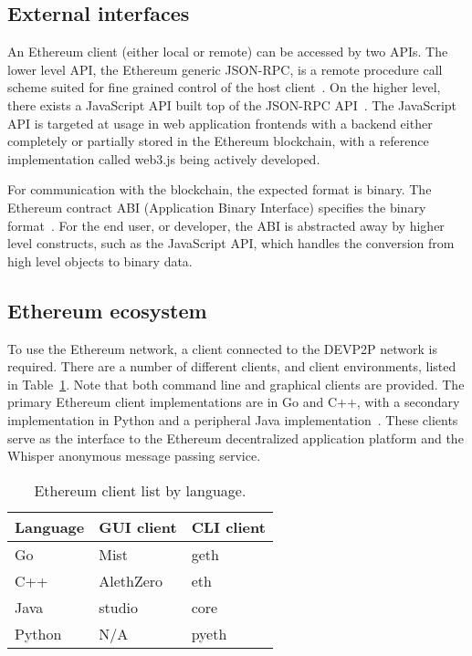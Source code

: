 \subsection{External interfaces}
An Ethereum client (either local or remote) can be accessed by two APIs. The lower level API, the Ethereum generic JSON-RPC, is a remote procedure call scheme suited for fine grained control of the host client~\cite{generic-json-rpc}. On the higher level, there exists a JavaScript API built top of the JSON-RPC API~\cite{javascript-api}. The JavaScript API is targeted at usage in web application frontends with a backend either completely or partially stored in the Ethereum blockchain, with a reference implementation called web3.js being actively developed.

For communication with the blockchain, the expected format is binary. The Ethereum contract ABI (Application Binary Interface) specifies the binary format~\cite{ethereum-contract-abi}. For the end user, or developer, the ABI is abstracted away by higher level constructs, such as the JavaScript API, which handles the conversion from high level objects to binary data.

\subsection{Ethereum ecosystem}
To use the Ethereum network, a client connected to the DEVP2P network is required. There are a number of different clients, and client environments, listed in Table~\ref{eth-clients}. Note that both command line and graphical clients are provided. The primary Ethereum client implementations are in Go and C++, with a secondary implementation in Python and a peripheral Java implementation~\cite{github-goeth}\cite{github-cppeth}\cite{github-javaeth}\cite{github-pyeth}. These clients serve as the interface to the Ethereum decentralized application platform and the Whisper anonymous message passing service.

\begin{table}[ht]
\centering
\caption{Ethereum client list by language.}
\label{eth-clients}
\begin{tabular}{|l|l|l|}
\hline \textbf{Language} & \textbf{GUI client} & \textbf{CLI client} \\ \hline
Go & Mist & geth \\ \hline
C++ & AlethZero & eth \\ \hline
Java & studio & core \\ \hline
Python & N/A & pyeth \\ \hline
\end{tabular}
\end{table}

